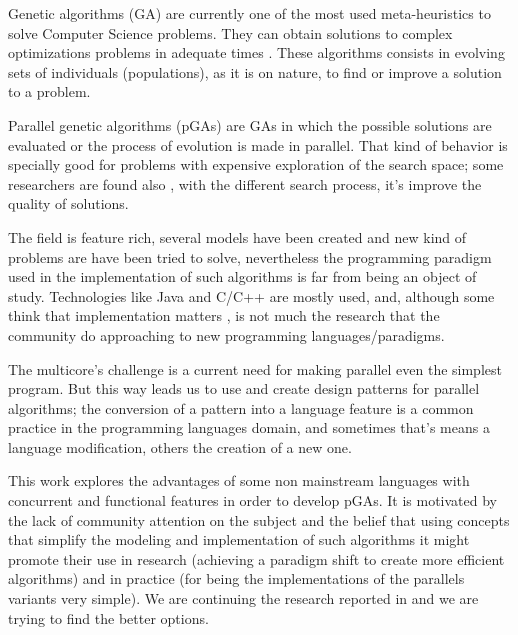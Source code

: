 
\noindent Genetic algorithms (GA) are currently one of the most used meta-heuristics to solve Computer Science problems. They can obtain solutions to complex optimizations problems in adequate times \cite{Luque2011}. These algorithms consists in evolving sets of individuals (populations), as it is on nature, to find or improve a solution to a problem.

Parallel genetic algorithms (pGAs) are GAs in which the possible solutions are evaluated or the process of evolution is made in parallel. That kind of behavior is specially good for problems with expensive exploration of the search space; some researchers are found also \cite{Alba2001}, with the different search process, it’s improve the quality of solutions.


The field is feature rich, several models have been created and new kind of problems are have been tried to solve, nevertheless the programming paradigm used in the implementation of such algorithms is far from being an object of study. Technologies like Java and C/C++ are mostly used, and, although some think that implementation matters \cite{DBLP:conf/iwann/MereloRACML11}, is not much the research that the community do approaching to new programming languages/paradigms.


The multicore’s challenge \cite{SutterL05} is a current need for making parallel even the simplest program. But this way leads us to use and create design patterns for parallel algorithms; the conversion of a pattern into a language feature is a common practice in the programming languages domain, and sometimes that’s means a language modification, others the creation of a new one.

This work explores the advantages of some non mainstream languages with concurrent and functional features in order to develop pGAs. It is motivated by the lack of community attention on the subject and the belief that using concepts that simplify the modeling and implementation of such algorithms it might promote their use in research (achieving a paradigm shift to create more efficient algorithms) and in practice (for being the implementations of the parallels variants very simple). We are continuing the research reported in \cite{DBLP:conf/gecco/CruzGGC13,J.Albert-Cruz2013} and we are trying to find the better options.


